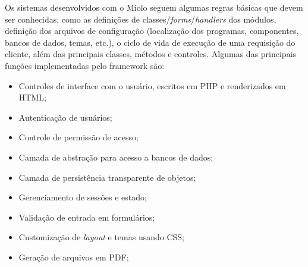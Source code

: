Os sistemas desenvolvidos com o Miolo seguem algumas regras básicas que devem 
ser conhecidas, como as definições de classes/\textit{forms}/\textit{handlers} 
dos módulos, definição dos arquivos de configuração (localização dos programas, 
componentes, bancos de dados, temas, etc.), o ciclo de vida de execução de uma 
requisição do cliente, além das principais classes, métodos e controles. 
Algumas das principais funções implementadas pelo framework são:

\begin{itemize}
	\item Controles de interface com o usuário, escritos em PHP e renderizados 
	em HTML;
	\item Autenticação de usuários;
	\item Controle de permissão de acesso;
	\item Camada de abstração para acesso a bancos de dados;
	\item Camada de persistência transparente de objetos;
	\item Gerenciamento de sessões e estado;
	\item Validação de entrada em formulários;
	\item Customização de \textit{layout} e temas usando CSS;
	\item Geração de arquivos em PDF;
\end{itemize}
